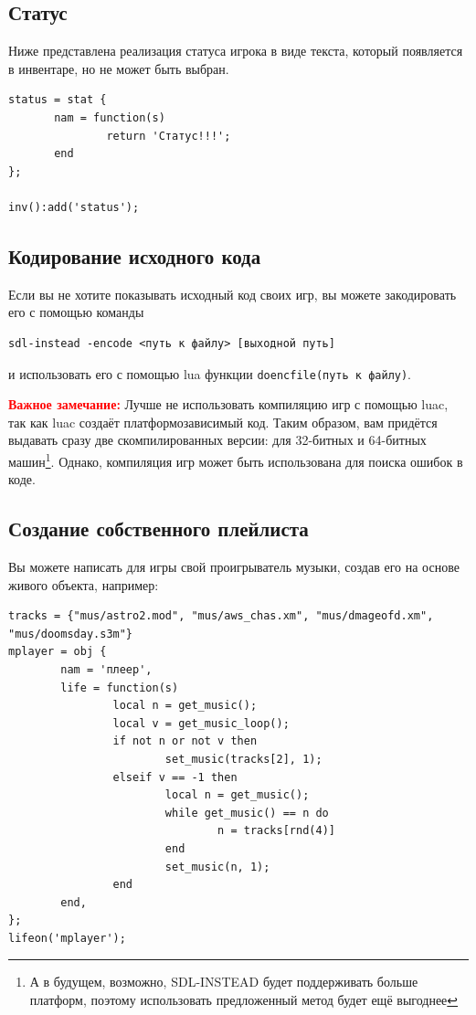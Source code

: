 \documentclass[a4paper,12pt]{article}
\begin{document}
\subsection{Статус}
Ниже представлена реализация статуса игрока в виде текста, который появляется в инвентаре, но не может быть выбран.

\begin{verbatim}
status = stat {
       nam = function(s)
               return 'Статус!!!';
       end
};

inv():add('status');
\end{verbatim}

\subsection{Кодирование исходного кода}

Если вы не хотите показывать исходный код своих игр, вы можете закодировать его с помощью команды

\begin{verbatim}
sdl-instead -encode <путь к файлу> [выходной путь]
\end{verbatim}

и использовать его с помощью lua функции \verb/doencfile(путь к файлу)/.

\textbf{\textcolor{red}{Важное замечание:}} Лучше не использовать компиляцию игр с помощью luac, так как luac создаёт платформозависимый код. Таким образом, вам придётся выдавать сразу две скомпилированных версии: для 32-битных и 64-битных машин\footnote{А в будущем, возможно, SDL-INSTEAD будет поддерживать больше платформ, поэтому использовать предложенный метод будет ещё выгоднее}. Однако, компиляция игр может быть использована для поиска ошибок в коде.

\subsection{Создание собственного плейлиста}
Вы можете написать для игры свой проигрыватель музыки, создав его на основе живого объекта, например:

\begin{verbatim}
tracks = {"mus/astro2.mod", "mus/aws_chas.xm", "mus/dmageofd.xm", "mus/doomsday.s3m"}
mplayer = obj {
        nam = 'плеер',
        life = function(s)
                local n = get_music();
                local v = get_music_loop();
                if not n or not v then
                        set_music(tracks[2], 1);
                elseif v == -1 then
                        local n = get_music();
                        while get_music() == n do
                                n = tracks[rnd(4)]
                        end
                        set_music(n, 1);
                end
        end,
};
lifeon('mplayer');
\end{verbatim}
\end{document}
